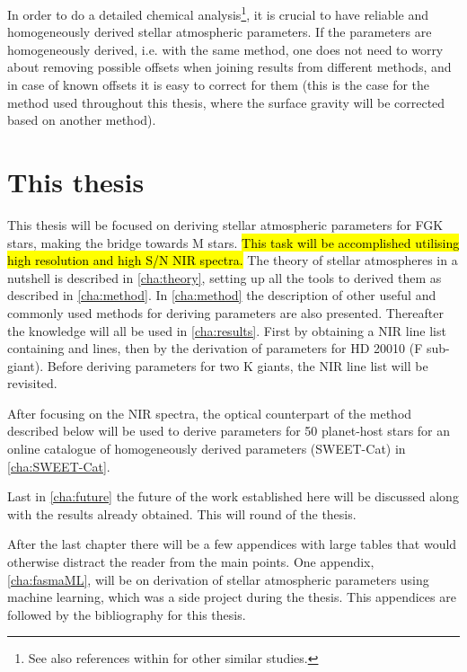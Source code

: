 In order to do a detailed chemical analysis\footnote{See also references within
\citet{Adibekyan2012} for other similar studies.}, it is crucial to have reliable and homogeneously
derived stellar atmospheric parameters. If the parameters are homogeneously derived, i.e. with the
same method, one does not need to worry about removing possible offsets when joining results from
different methods, and in case of known offsets it is easy to correct for them (this is the case for
the method used throughout this thesis, where the surface gravity will be corrected based on another
method).


\section{This thesis}
\label{sec:this_thesis}

This thesis will be focused on deriving stellar atmospheric parameters for FGK stars, making the
bridge towards M stars. \hl{This task will be accomplished utilising high resolution and high S/N
NIR spectra.} The theory of stellar atmospheres in a nutshell is described in \cref{cha:theory},
setting up all the tools to derived them as described in \cref{cha:method}. In \cref{cha:method} the
description of other useful and commonly used methods for deriving parameters are also presented.
Thereafter the knowledge will all be used in \cref{cha:results}. First by obtaining a NIR line list
containing  and  lines, then by the derivation of parameters for HD 20010 (F
sub-giant). Before deriving parameters for two K giants, the NIR line list will be revisited.

After focusing on the NIR spectra, the optical counterpart of the method described below will be
used to derive parameters for 50 planet-host stars for an online catalogue of homogeneously derived
parameters (SWEET-Cat) in \cref{cha:SWEET-Cat}.

Last in \cref{cha:future} the future of the work established here will be discussed along with the
results already obtained. This will round of the thesis.

After the last chapter there will be a few appendices with large tables that would otherwise
distract the reader from the main points. One appendix, \cref{cha:fasmaML}, will be on derivation of
stellar atmospheric parameters using machine learning, which was a side project during the thesis.
This appendices are followed by the bibliography for this thesis.

